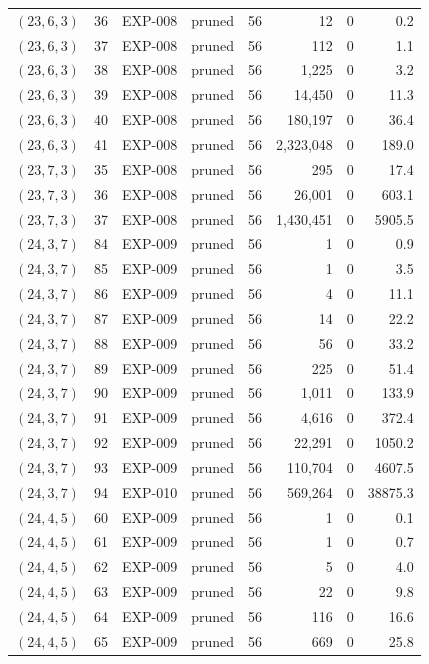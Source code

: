 \begin{longtable}{lrllrrrr}
$(23,6,3)$ & 36 & EXP-008 & pruned & 56 & 12 & 0 & 0.2 \\
$(23,6,3)$ & 37 & EXP-008 & pruned & 56 & 112 & 0 & 1.1 \\
$(23,6,3)$ & 38 & EXP-008 & pruned & 56 & 1{,}225 & 0 & 3.2 \\
$(23,6,3)$ & 39 & EXP-008 & pruned & 56 & 14{,}450 & 0 & 11.3 \\
$(23,6,3)$ & 40 & EXP-008 & pruned & 56 & 180{,}197 & 0 & 36.4 \\
$(23,6,3)$ & 41 & EXP-008 & pruned & 56 & 2{,}323{,}048 & 0 & 189.0 \\
$(23,7,3)$ & 35 & EXP-008 & pruned & 56 & 295 & 0 & 17.4 \\
$(23,7,3)$ & 36 & EXP-008 & pruned & 56 & 26{,}001 & 0 & 603.1 \\
$(23,7,3)$ & 37 & EXP-008 & pruned & 56 & 1{,}430{,}451 & 0 & 5905.5 \\
$(24,3,7)$ & 84 & EXP-009 & pruned & 56 & 1 & 0 & 0.9 \\
$(24,3,7)$ & 85 & EXP-009 & pruned & 56 & 1 & 0 & 3.5 \\
$(24,3,7)$ & 86 & EXP-009 & pruned & 56 & 4 & 0 & 11.1 \\
$(24,3,7)$ & 87 & EXP-009 & pruned & 56 & 14 & 0 & 22.2 \\
$(24,3,7)$ & 88 & EXP-009 & pruned & 56 & 56 & 0 & 33.2 \\
$(24,3,7)$ & 89 & EXP-009 & pruned & 56 & 225 & 0 & 51.4 \\
$(24,3,7)$ & 90 & EXP-009 & pruned & 56 & 1{,}011 & 0 & 133.9 \\
$(24,3,7)$ & 91 & EXP-009 & pruned & 56 & 4{,}616 & 0 & 372.4 \\
$(24,3,7)$ & 92 & EXP-009 & pruned & 56 & 22{,}291 & 0 & 1050.2 \\
$(24,3,7)$ & 93 & EXP-009 & pruned & 56 & 110{,}704 & 0 & 4607.5 \\
$(24,3,7)$ & 94 & EXP-010 & pruned & 56 & 569{,}264 & 0 & 38875.3 \\
$(24,4,5)$ & 60 & EXP-009 & pruned & 56 & 1 & 0 & 0.1 \\
$(24,4,5)$ & 61 & EXP-009 & pruned & 56 & 1 & 0 & 0.7 \\
$(24,4,5)$ & 62 & EXP-009 & pruned & 56 & 5 & 0 & 4.0 \\
$(24,4,5)$ & 63 & EXP-009 & pruned & 56 & 22 & 0 & 9.8 \\
$(24,4,5)$ & 64 & EXP-009 & pruned & 56 & 116 & 0 & 16.6 \\
$(24,4,5)$ & 65 & EXP-009 & pruned & 56 & 669 & 0 & 25.8 \\

\end{longtable}
